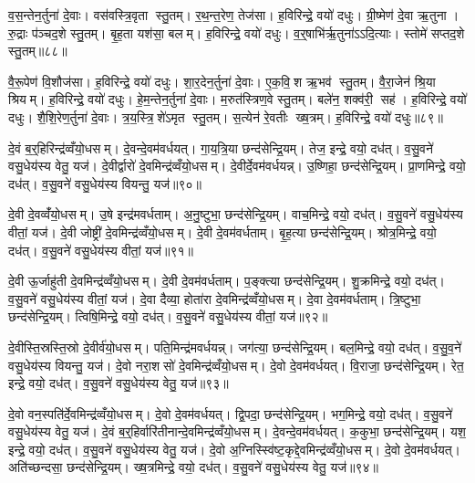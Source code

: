 व॒स॒न्तेन॒र्तुना॑ दे॒वाः। वस॑वस्त्रि॒वृता स्तु॒तम्। र॒थ॒न्त॒रेण॒ तेज॑सा। ह॒विरिन्द्रे॒ वयो॑ दधुः। ग्री॒ष्मेण॑ दे॒वा ऋ॒तुना। रु॒द्राः प॑ञ्चद॒शे स्तु॒तम्। बृ॒ह॒ता यश॑सा॒ बलम्। ह॒विरिन्द्रे॒ वयो॑ दधुः। व॒र्॒षाभि॑र्\mbox{}ऋ॒तुना॑ऽऽदि॒त्याः। स्तोमे॑ सप्तद॒शे स्तु॒तम्॥८८॥

वै॒रू॒पेण॑ वि॒शौज॑सा। ह॒विरिन्द्रे॒ वयो॑ दधुः। शा॒र॒देन॒र्तुना॑ दे॒वाः। ए॒क॒वि॒श ऋ॒भव॑ स्तु॒तम्। वै॒रा॒जेन॑ श्रि॒या श्रियम्। ह॒विरिन्द्रे॒ वयो॑ दधुः। हे॒म॒न्तेन॒र्तुना॑ दे॒वाः। म॒रुत॑स्त्रिण॒वे स्तु॒तम्। बले॑न॒ शक्व॑री॒ सह॑। ह॒विरिन्द्रे॒ वयो॑ दधुः। शै॒शि॒रेण॒र्तुना॑ दे॒वाः। त्र॒य॒स्त्रि॒शे॑ऽमृत स्तु॒तम्। स॒त्येन॑ रे॒वतीः ख्ष॒त्रम्। ह॒विरिन्द्रे॒ वयो॑ दधुः॥८९॥\anuvakamend[स्तोमे॑ सप्तद॒शे स्तु॒त सहो॑ ह॒विरिन्द्रे॒ वयो॑ दधुश्च॒त्वारि॑ च (व॒स॒न्तेन॑ ग्री॒ष्मेण॑ व॒र्‌षाभि॑श्शार॒देन॑ हेम॒न्तेन॑ शैशि॒रेण॒ षट् ॥ )]

दे॒वं ब॒र्॒हिरिन्द्र॑व्वँयो॒धसम्। दे॒वन्दे॒वम॑वर्धयत्। गा॒य॒त्रि॒या छन्द॑सेन्द्रि॒यम्। तेज॒ इन्द्रे॒ वयो॒ दध॑त्। व॒सु॒वने॑ वसु॒धेय॑स्य वेतु॒ यज॑। दे॒वीर्द्वारो॑ दे॒वमिन्द्र॑व्वँयो॒धसम्। दे॒वीर्दे॒वम॑वर्धयन्न्। उ॒ष्णिहा॒ छन्द॑सेन्द्रि॒यम्। प्रा॒णमिन्द्रे॒ वयो॒ दध॑त्। व॒सु॒वने॑ वसु॒धेय॑स्य वियन्तु॒ यज॑॥९०॥

दे॒वी दे॒वव्वँ॑यो॒धसम्। उ॒षे इन्द्र॑मवर्धताम्। अ॒नु॒ष्टुभा॒ छन्द॑सेन्द्रि॒यम्। वाच॒मिन्द्रे॒ वयो॒ दध॑त्। व॒सु॒वने॑ वसु॒धेय॑स्य वीतां॒ यज॑। दे॒वी जोष्ट्री॑ दे॒वमिन्द्र॑व्वँयो॒धसम्। दे॒वी दे॒वम॑वर्धताम्। बृ॒ह॒त्या छन्द॑सेन्द्रि॒यम्। श्रोत्र॒मिन्द्रे॒ वयो॒ दध॑त्। व॒सु॒वने॑ वसु॒धेय॑स्य वीतां॒ यज॑॥९१॥

दे॒वी ऊ॒र्जाहु॑ती दे॒वमिन्द्र॑व्वँयो॒धसम्। दे॒वी दे॒वम॑वर्धताम्। प॒ङ्क्त्या छन्द॑सेन्द्रि॒यम्। शु॒क्रमिन्द्रे॒ वयो॒ दध॑त्। व॒सु॒वने॑ वसु॒धेय॑स्य वीतां॒ यज॑। दे॒वा दैव्या॒ होता॑रा दे॒वमिन्द्र॑व्वँयो॒धसम्। दे॒वा दे॒वम॑वर्धताम्। त्रि॒ष्टुभा॒ छन्द॑सेन्द्रि॒यम्। त्विषि॒मिन्द्रे॒ वयो॒ दध॑त्। व॒सु॒वने॑ वसु॒धेय॑स्य वीतां॒ यज॑॥९२॥

दे॒वीस्ति॒स्रस्ति॒स्रो दे॒वीर्व॑यो॒धसम्। पति॒मिन्द्र॑मवर्धयन्न्। जग॑त्या॒ छन्द॑सेन्द्रि॒यम्। बल॒मिन्द्रे॒ वयो॒ दध॑त्। व॒सु॒व॒ने॑ वसु॒धेय॑स्य वियन्तु॒ यज॑। दे॒वो नरा॒शसो॑ दे॒वमिन्द्र॑व्वँयो॒धसम्। दे॒वो दे॒वम॑वर्धयत्। वि॒राजा॒ छन्द॑सेन्द्रि॒यम्। रेत॒ इन्द्रे॒ वयो॒ दध॑त्। व॒सु॒वने॑ वसु॒धेय॑स्य वेतु॒ यज॑॥९३॥

दे॒वो वन॒स्पति॑र्दे॒वमिन्द्र॑व्वँयो॒धसम्। दे॒वो दे॒वम॑वर्धयत्। द्वि॒पदा॒ छन्द॑सेन्द्रि॒यम्। भग॒मिन्द्रे॒ वयो॒ दध॑त्। व॒सु॒वने॑ वसु॒धेय॑स्य वेतु॒ यज॑। दे॒वं ब॒र्॒हिर्वारि॑तीनान्दे॒वमिन्द्र॑व्वँयो॒धसम्। दे॒वन्दे॒वम॑वर्धयत्। क॒कुभा॒ छन्द॑सेन्द्रि॒यम्। यश॒ इन्द्रे॒ वयो॒ दध॑त्। व॒सु॒वने॑ वसु॒धेय॑स्य वेतु॒ यज॑। दे॒वो अ॒ग्निस्स्वि॑ष्ट॒कृद्दे॒वमिन्द्र॑व्वँयो॒धसम्। दे॒वो दे॒वम॑वर्धयत्। अति॑च्छन्दसा॒ छन्द॑सेन्द्रि॒यम्। ख्ष॒त्रमिन्द्रे॒ वयो॒ दध॑त्। व॒सु॒वने॑ वसु॒धेय॑स्य वेतु॒ यज॑॥९४॥

